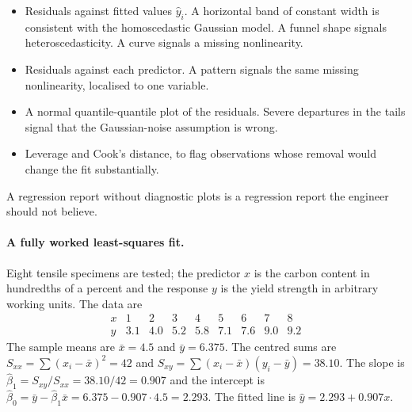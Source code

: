 \begin{itemize}[leftmargin=*]
  \item Residuals against fitted values $\hat{y}_{i}$. A horizontal
    band of constant width is consistent with the homoscedastic
    Gaussian model. A funnel shape signals heteroscedasticity. A
    curve signals a missing nonlinearity.
  \item Residuals against each predictor. A pattern signals the
    same missing nonlinearity, localised to one variable.
  \item A normal quantile-quantile plot of the residuals. Severe
    departures in the tails signal that the Gaussian-noise
    assumption is wrong.
  \item Leverage and Cook's distance, to flag observations whose
    removal would change the fit substantially.
\end{itemize}

A regression report without diagnostic plots is a regression report
the engineer should not believe.

\paragraph{A fully worked least-squares fit.} Eight tensile
specimens are tested; the predictor $x$ is the carbon content in
hundredths of a percent and the response $y$ is the yield strength
in arbitrary working units. The data are
\[
\begin{array}{c|cccccccc}
x & 1 & 2 & 3 & 4 & 5 & 6 & 7 & 8 \\ \hline
y & 3.1 & 4.0 & 5.2 & 5.8 & 7.1 & 7.6 & 9.0 & 9.2
\end{array}
\]
The sample means are $\bar{x} = 4.5$ and $\bar{y} = 6.375$. The
centred sums are $S_{xx} = \sum(x_{i} - \bar{x})^{2} = 42$ and
$S_{xy} = \sum(x_{i} - \bar{x})(y_{i} - \bar{y}) = 38.10$. The slope
is $\hat{\beta}_{1} = S_{xy}/S_{xx} = 38.10/42 = 0.907$ and the
intercept is $\hat{\beta}_{0} = \bar{y} - \hat{\beta}_{1}\bar{x} =
6.375 - 0.907 \cdot 4.5 = 2.293$. The fitted line is
$\hat{y} = 2.293 + 0.907 x$.

